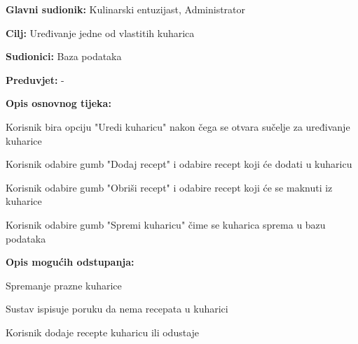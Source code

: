 					\noindent {}
					\begin{packed_item}
	
						\item \textbf{Glavni sudionik: } Kulinarski entuzijast, Administrator 
						\item  \textbf{Cilj:} Uređivanje jedne od vlastitih kuharica
						\item  \textbf{Sudionici:} Baza podataka
						\item  \textbf{Preduvjet:} -
						\item  \textbf{Opis osnovnog tijeka:} 
						
						\item[] \begin{packed_enum}
	
						\item Korisnik bira opciju "Uredi kuharicu" nakon čega se otvara sučelje za uređivanje kuharice
						\item Korisnik odabire gumb "Dodaj recept" i odabire recept koji će dodati u kuharicu				
						\item Korisnik odabire gumb "Obriši recept" i odabire recept koji će se maknuti iz kuharice
						\item Korisnik odabire gumb "Spremi kuharicu" čime se kuharica sprema u bazu podataka
						\end{packed_enum}
						
						\item  \textbf{Opis mogućih odstupanja:}
						
						\item[] \begin{packed_item}
	
							\item[2.a] Spremanje prazne kuharice
							\item[] \begin{packed_enum}
								
								\item Sustav ispisuje poruku da nema recepata u kuharici
								\item Korisnik dodaje recepte kuharicu ili odustaje
								
							\end{packed_enum}							


						\end{packed_item}
					\end{packed_item}



